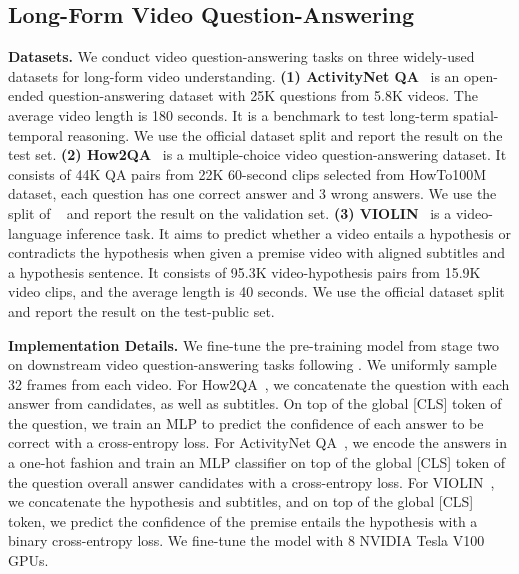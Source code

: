 \documentclass{article}
\begin{document}
\subsection{Long-Form Video Question-Answering}
\textbf{Datasets.}
We conduct video question-answering tasks on three widely-used datasets for long-form video understanding.
\textbf{(1) ActivityNet QA}~\cite{yu2019activitynetqa} is an open-ended question-answering dataset with 25K questions from 5.8K videos. The average video length is 180 seconds. It is a benchmark to test long-term spatial-temporal reasoning. We use the official dataset split and report the result on the test set.
\textbf{(2) How2QA}~\cite{li2020hero} is a multiple-choice video question-answering dataset. It consists of 44K QA pairs from 22K 60-second clips selected from HowTo100M~\cite{miech2019howto100m} dataset, each question has one correct answer and 3 wrong answers. We use the split of ~\cite{li2021value} and report the result on the validation set.
\textbf{(3) VIOLIN}~\cite{liu2020violin} is a video-language inference task. It aims to predict whether a video entails a hypothesis or contradicts the hypothesis when given a premise video with aligned subtitles and a hypothesis sentence. It consists of 95.3K video-hypothesis pairs from 15.9K video clips, and the average length is 40 seconds. We use the official dataset split and report the result on the test-public set.

\textbf{Implementation Details.}
We fine-tune the pre-training model from stage two on downstream video question-answering tasks following \cite{xue2021hdvila}.
We uniformly sample 32 frames from each video.
For How2QA~\cite{li2020hero}, we concatenate the question with each answer from candidates, as well as subtitles. On top of the global [CLS] token of the question, we train an MLP to predict the confidence of each answer to be correct with a cross-entropy loss.
For ActivityNet QA~\cite{yu2019activitynetqa}, we encode the answers in a one-hot fashion and train an MLP classifier on top of the global [CLS] token of the question overall answer candidates with a cross-entropy loss.
For VIOLIN~\cite{liu2020violin}, we concatenate the hypothesis and subtitles, and on top of the global [CLS] token, we predict the confidence of the premise entails the hypothesis with a binary cross-entropy loss. We fine-tune the model with 8 NVIDIA Tesla V100 GPUs. 
\end{document}

